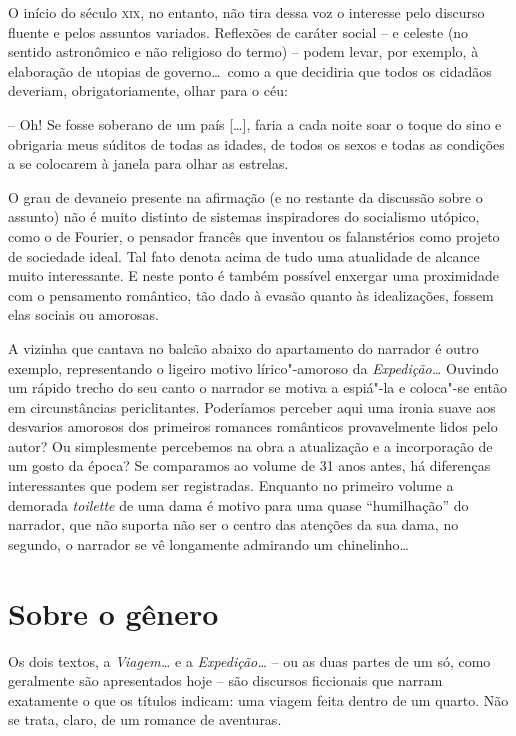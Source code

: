 O início do século \textsc{xix}, no entanto, não tira dessa voz o interesse pelo
discurso fluente e pelos assuntos variados. Reflexões de caráter social
-- e celeste (no sentido astronômico e não religioso do termo) -- podem
levar, por exemplo, à elaboração de utopias de governo\ldots\ como a que
decidiria que todos os cidadãos deveriam, obrigatoriamente, olhar para o céu: 

\begin{hedraquote}
-- Oh! Se fosse soberano de um país [\ldots], faria a cada noite
soar o toque do sino e obrigaria meus súditos de todas as idades, de
todos os sexos e todas as condições a se colocarem à janela para olhar
as estrelas.
\end{hedraquote}

O grau de devaneio presente na afirmação (e no restante da discussão
sobre o assunto) não é muito distinto de sistemas inspiradores do
socialismo utópico, como o de Fourier, o pensador francês que inventou
os falanstérios como projeto de sociedade ideal. Tal fato denota acima
de tudo uma atualidade de alcance muito interessante. E neste ponto é
também possível enxergar uma proximidade com o pensamento romântico,
tão dado à evasão quanto às idealizações, fossem elas sociais ou
amorosas.

 A vizinha que cantava no balcão abaixo do apartamento do narrador é
outro exemplo, representando o ligeiro motivo lírico"-amoroso da
\textit{Expedição\ldots} Ouvindo um rápido trecho do seu canto o narrador
se motiva a espiá"-la e coloca"-se então em circunstâncias periclitantes.
Poderíamos perceber aqui uma ironia suave aos desvarios amorosos dos
primeiros romances românticos provavelmente lidos pelo autor? Ou
simplesmente percebemos na obra a atualização e a incorporação de um
gosto da época? Se comparamos ao volume de 31 anos antes, há diferenças
interessantes que podem ser registradas. Enquanto no primeiro volume a
demorada \textit{toilette} de uma dama é motivo para uma quase
``humilhação'' do narrador, que não suporta não ser o centro das atenções
da sua dama, no segundo, o narrador se vê longamente admirando um
chinelinho\ldots 

\section{Sobre o gênero}

Os dois textos, a \textit{Viagem\ldots} e a \textit{Expedição\ldots} -- ou as
duas partes de um só, como geralmente são apresentados hoje -- são
discursos ficcionais que narram exatamente o que os títulos indicam:
uma viagem feita dentro de um quarto. Não se trata, claro, de um
romance de aventuras. 

